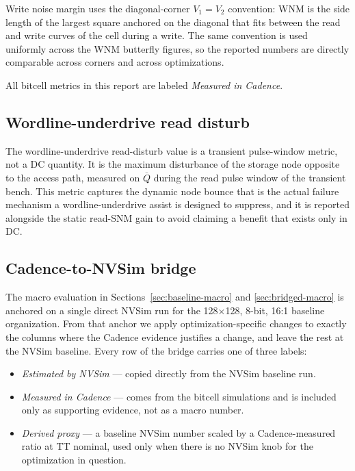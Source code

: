 \documentclass[pdflatex,sn-mathphys-num,iicol]{sn-jnl}%
\theoremstyle{thmstyleone}%
\theoremstyle{thmstyletwo}%
\theoremstyle{thmstylethree}%
\begin{document}
Write noise margin uses the diagonal-corner $V_1=V_2$ convention: WNM is the side length of the largest square anchored on the diagonal that fits between the read and write curves of the cell during a write. The same convention is used uniformly across the WNM butterfly figures, so the reported numbers are directly comparable across corners and across optimizations.

All bitcell metrics in this report are labeled \emph{Measured in Cadence}.

\subsection{Wordline-underdrive read disturb}\label{sec:methodology-readdisturb}

The wordline-underdrive read-disturb value is a transient pulse-window metric, not a DC quantity. It is the maximum disturbance of the storage node opposite to the access path, measured on $\overline{Q}$ during the read pulse window of the transient bench. This metric captures the dynamic node bounce that is the actual failure mechanism a wordline-underdrive assist is designed to suppress, and it is reported alongside the static read-SNM gain to avoid claiming a benefit that exists only in DC.

\subsection{Cadence-to-NVSim bridge}\label{sec:methodology-bridge}

The macro evaluation in Sections~\ref{sec:baseline-macro} and \ref{sec:bridged-macro} is anchored on a single direct NVSim run for the 128$\times$128, 8-bit, 16:1 baseline organization. From that anchor we apply optimization-specific changes to exactly the columns where the Cadence evidence justifies a change, and leave the rest at the NVSim baseline. Every row of the bridge carries one of three labels:

\begin{itemize}
    \item \emph{Estimated by NVSim} --- copied directly from the NVSim baseline run.
    \item \emph{Measured in Cadence} --- comes from the bitcell simulations and is included only as supporting evidence, not as a macro number.
    \item \emph{Derived proxy} --- a baseline NVSim number scaled by a Cadence-measured ratio at TT nominal, used only when there is no NVSim knob for the optimization in question.
\end{itemize}
\end{document}
